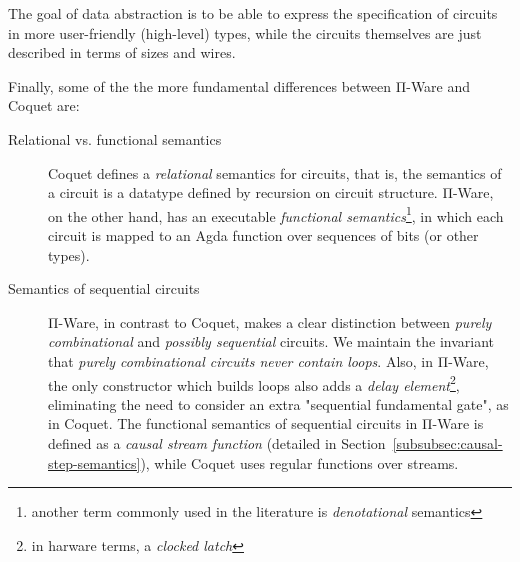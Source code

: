             The goal of data abstraction is to be able to express the specification of circuits in
            more user-friendly (high-level) types, while the circuits themselves are just described
            in terms of sizes and wires.

            Finally, some of the the more fundamental differences between Π-Ware and Coquet are:

            \begin{description}
                \item[Relational vs. functional semantics]
                    Coquet defines a \emph{relational} semantics for circuits,
                    that is, the semantics of a circuit is a datatype defined by recursion on circuit structure.
                    Π-Ware, on the other hand, has an executable
                    \emph{functional semantics}\footnote{another term commonly used in the literature is \emph{denotational} semantics},
                    in which each circuit is mapped to an Agda function over sequences of bits (or other types).
                \item[Semantics of sequential circuits]
                    Π-Ware, in contrast to Coquet, makes a clear distinction between \emph{purely combinational}
                    and \emph{possibly sequential} circuits.
                    We maintain the invariant that \emph{purely combinational circuits never contain loops}.
                    Also, in Π-Ware, the only constructor which builds loops also adds a
                    \emph{delay element}\footnote{in harware terms, a \emph{clocked latch}},
                    eliminating the need to consider an extra "sequential fundamental gate", as in Coquet.
                    The functional semantics of sequential circuits in Π-Ware is defined as a \emph{causal stream function}
                    (detailed in Section~\ref{subsubsec:causal-step-semantics}), while Coquet uses regular functions over streams.
            \end{description}

